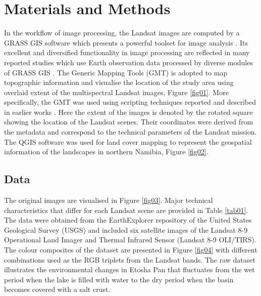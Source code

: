 \documentclass[draft]{agujournal2019}
\begin{document}
\section{Materials and Methods}
 
In the workflow of image processing, the Landsat images are computed by a GRASS GIS software which presents a powerful toolset for image analysis \cite{GRASS_GIS_software}. Its excellent and diversified functionality in image processing are reflected in many reported studies which use Earth observation data processed by diverse modules of GRASS GIS \cite{HOFIERKA2009387,Lemenkova202320,ROCCHINI201382,Lemenkova202313,JASIEWICZ20111162}. The Generic Mapping Tools (GMT) \cite{Wessel} is adopted to map topographic information and visualise the location of the study area using overlaid extent of the multispectral Landsat images, Figure \ref{fig01}. More specifically, the GMT was used using scripting techniques reported and described in earlier works \cite{Lemenkova202203,Lemenkova202217,technologies11020046}. Here the extent of the images is denoted by the rotated square showing the location of the Landsat scenes. Their coordinates were derived from the metadata and correspond to the technical parameters of the Landsat mission. The QGIS software was used for land cover mapping to represent the geospatial information of the landscapes in northern Namibia, Figure \ref{fig02}. 

\subsection{Data}
The original images are visualised in Figure \ref{fig03}. Major technical characteristics that differ for each Landsat scene are provided in Table \ref{tab01}. The data were obtained from the EarthExplorer repository of the United States Geological Survey (USGS) and included six satellite images of the Landsat 8-9 Operational Land Imager and Thermal Infrared Sensor (Landsat 8-9 OLI/TIRS). The colour composites of the dataset are presented in Figure \ref{fig04} with different combinations used as the RGB triplets from the Landsat bands. The raw dataset illustrates the environmental changes in Etosha Pan that fluctuates from the wet period when the lake is filled with water to the dry period when the basin becomes covered with a salt crust. 
\end{document}
